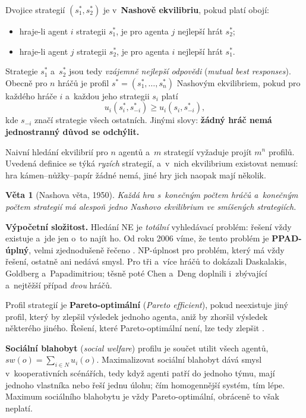 \documentclass[11pt,a4paper]{article}
\newtheorem{veta}{Věta}[section]
\theoremstyle{definition}
\begin{document}
\begin{defbox}
Dvojice strategií $(s_1^*, s_2^*)$ je v~\textbf{Nashově ekvilibriu}, pokud platí obojí:
\begin{itemize}
\item hraje-li agent $i$ strategii $s_1^*$, je pro agenta $j$ nejlepší hrát $s_2^*$;
\item hraje-li agent $j$ strategii $s_2^*$, je pro agenta $i$ nejlepší hrát $s_1^*$.
\end{itemize}
Strategie $s_1^*$ a~$s_2^*$ jsou tedy \emph{vzájemně nejlepší odpovědi} (\emph{mutual best
responses}). Obecně pro $n$ hráčů je profil $s^* = (s_1^*,\dots,s_n^*)$ Nashovým ekvilibriem,
pokud pro každého hráče $i$ a~každou jeho strategii $s_i$ platí
\[
u_i(s_i^*, s_{-i}^*) \ge u_i(s_i, s_{-i}^*),
\]
kde $s_{-i}$ značí strategie všech ostatních. Jinými slovy: \textbf{žádný hráč nemá jednostranný
důvod se odchýlit.}

Naivní hledání ekvilibrií pro $n$ agentů a~$m$ strategií vyžaduje projít $m^n$ profilů. Uvedená
definice se týká \emph{ryzích} strategií, a~v~nich ekvilibrium existovat nemusí: hra
kámen--nůžky--papír žádné nemá, jiné hry jich naopak mají několik.
\end{defbox}

\begin{veta}[Nashova věta, 1950]
Každá hra s~konečným počtem hráčů a~konečným počtem strategií má alespoň jedno Nashovo
ekvilibrium \emph{ve smíšených strategiích}.
\end{veta}

\textbf{Výpočetní složitost.} Hledání NE je \emph{totální} vyhledávací problém: řešení vždy
existuje a~jde jen o~to najít ho. Od roku 2006 víme, že tento problém je \textbf{PPAD-úplný},
velmi zjednodušeně řečeno . NP-úplnost pro problém,
který má vždy řešení, ostatně ani nedává smysl. Pro tři a~více hráčů to dokázali Daskalakis,
Goldberg a~Papadimitriou; těsně poté Chen a~Deng doplnili i~zbývající a~nejtěžší případ
\emph{dvou} hráčů.

\begin{defbox}
Profil strategií je \textbf{Pareto-optimální} (\emph{Pareto efficient}), pokud neexistuje jiný
profil, který by zlepšil výsledek jednoho agenta, aniž by zhoršil výsledek některého jiného.
Řešení, které Pareto-optimální není, lze tedy zlepšit .

\textbf{Sociální blahobyt} (\emph{social welfare}) profilu je součet utilit všech agentů,
$\mathit{sw}(o) = \sum_{i \in N} u_i(o)$. Maximalizovat sociální blahobyt dává smysl
v~kooperativních scénářích, tedy když agenti patří do jednoho týmu, mají jednoho vlastníka nebo
řeší jednu úlohu; čím homogennější systém, tím lépe. Maximum sociálního blahobytu je vždy
Pareto-optimální, obráceně to však neplatí.
\end{defbox}
\end{document}
